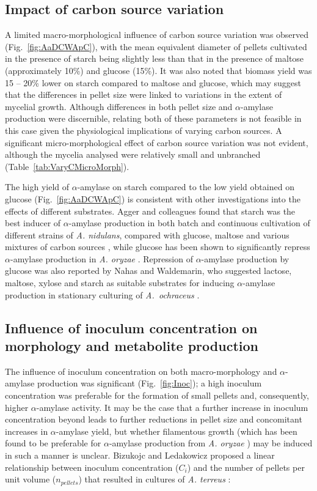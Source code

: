 \subsection{Impact of carbon source variation}

A limited macro-morphological influence of carbon source variation was observed (Fig.~\ref{fig:AaDCWApC}), with the mean equivalent diameter of pellets cultivated in the presence of starch being slightly less than that in the presence of maltose (approximately 10\%) and glucose (15\%). It was also noted that biomass yield was 15 -- 20\% lower on starch compared to maltose and glucose, which may suggest that the differences in pellet size were linked to variations in the extent of mycelial growth. Although differences in both pellet size and $\alpha$-amylase production were discernible, relating both of these parameters is not feasible in this case given the physiological implications of varying carbon sources. A significant micro-morphological effect of carbon source variation was not evident, although the mycelia analysed were relatively small and unbranched (Table~\ref{tab:VaryCMicroMorph}).

The high yield of $\alpha$-amylase on starch compared to the low yield obtained on glucose (Fig.~\ref{fig:AaDCWApC}) is consistent with other investigations into the effects of different substrates. Agger and colleagues found that starch was the best inducer of $\alpha$-amylase production in both batch and continuous cultivation of different strains of \emph{A. nidulans}, compared with glucose, maltose and various mixtures of carbon sources \cite{agger2002}, while glucose has been shown to significantly repress $\alpha$-amylase production in \emph{A. oryzae} \cite{carlsen1996b}. Repression of $\alpha$-amylase production by glucose was also reported by Nahas and Waldemarin, who suggested lactose, maltose, xylose and starch as suitable substrates for inducing $\alpha$-amylase production in stationary culturing of \emph{A.~ochraceus} \cite{nahas2002}.

\subsection{Influence of inoculum concentration on morphology and metabolite production}

The influence of inoculum concentration on both macro-morphology and $\alpha$-amylase production was significant (Fig.~\ref{fig:Inoc}); a high inoculum concentration was preferable for the formation of small pellets and, consequently, higher $\alpha$-amylase activity. It may be the case that a further increase in inoculum concentration beyond  leads to further reductions in pellet size and concomitant increases in $\alpha$-amylase yield, but whether filamentous growth (which has been found to be preferable for $\alpha$-amylase production from \emph{A. oryzae} \cite{carlsen1996a}) may be induced in such a manner is unclear. Bizukojc and Ledakowicz proposed a linear relationship between inoculum concentration ($C_i$) and the number of pellets per unit volume ($n_{pellets}$) that resulted in cultures of \emph{A. terreus} \cite{bizukojc2009}:

